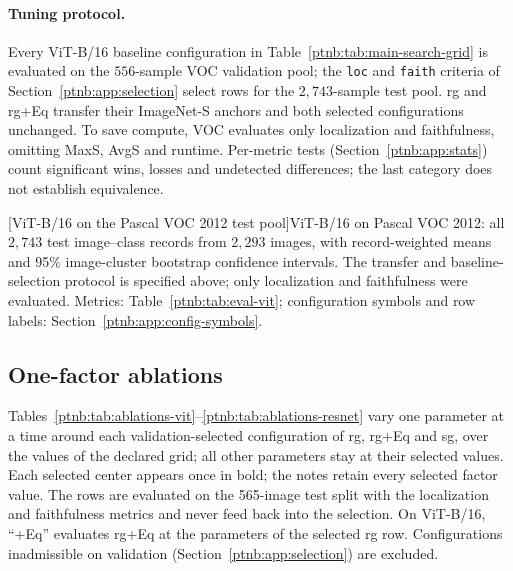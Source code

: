 \paragraph{Tuning protocol.}
Every ViT-B/16 baseline configuration in Table~\ref{ptnb:tab:main-search-grid} is evaluated on the $556$-sample VOC validation pool; the \texttt{loc} and \texttt{faith} criteria of Section~\ref{ptnb:app:selection} select rows for the $2{,}743$-sample test pool. \ac{rg} and \ac{rg}+Eq transfer their ImageNet-S anchors and both selected configurations unchanged. To save compute, VOC evaluates only localization and faithfulness, omitting MaxS, AvgS and runtime. Per-metric tests (Section~\ref{ptnb:app:stats}) count significant wins, losses and undetected differences; the last category does not establish equivalence.

\begin{center}
    \captionsetup{hypcap=false}
    [ViT-B/16 on the Pascal VOC 2012 test pool]{ViT-B/16 on Pascal VOC 2012: all $2{,}743$ test image--class records from $2{,}293$ images, with record-weighted means and 95\% image-cluster bootstrap confidence intervals. The transfer and baseline-selection protocol is specified above; only localization and faithfulness were evaluated. Metrics: Table~\ref{ptnb:tab:eval-vit}; configuration symbols and row labels: Section~\ref{ptnb:app:config-symbols}.}
    \label{ptnb:tab:eval-vit-voc}
\end{center}
\captionsetup{hypcap=true}

\providecommand{\absval}[2]{
\begin{tabular}[c]{@{}c@{}}#1\\\textcolor{gray!70}{\scriptsize #2}\end{tabular}}

\subsection{One-factor ablations}\label{ptnb:app:abl-one-factor}\label{ptnb:app:tradeoff-sweeps}\label{ptnb:app:dual-sweeps}\label{app:dual-sweeps}
Tables~\ref{ptnb:tab:ablations-vit}--\ref{ptnb:tab:ablations-resnet} vary one parameter at a time around each validation-selected configuration of \ac{rg}, \ac{rg}+Eq and \ac{sg}, over the values of the declared grid; all other parameters stay at their selected values. Each selected center appears once in bold; the notes retain every selected factor value. The rows are evaluated on the 565-image test split with the localization and faithfulness metrics and never feed back into the selection. On ViT-B/16, ``+Eq'' evaluates \ac{rg}+Eq at the parameters of the selected \ac{rg} row. Configurations inadmissible on validation (Section~\ref{ptnb:app:selection}) are excluded.

